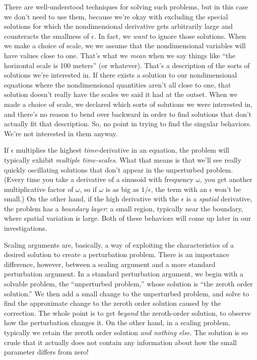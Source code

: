 \documentclass[11pt]{book}
\begin{document}
There are well-understood techniques for solving such problems, but in this case we don't need to use them, because we're okay with excluding the special solutions for which the nondimensional derivative gets arbitrarily large and counteracts the smallness of $\epsilon$.  In fact, we \emph{want} to ignore those solutions.  When we make a choice of scale, we we assume that the nondimensional variables will have values close to one.  That's what we \emph{mean} when we say things like ``the horizontal scale is 100 meters'' (or whatever).  That's a description of the sorts of solutions we're interested in.  If there exists a solution to our nondimensional equations where the nondimensional quantities aren't all close to one, that solution doesn't really have the scales we said it had at the outset.  When we made a choice of scale, we declared which sorts of solutions we were interested in, and there's no reason to bend over backward in order to find solutions that don't actually fit that description.  So, no point in trying to find the singular behaviors.  We're not interested in them anyway.

If $\epsilon$ multiplies the highest \emph{time}-derivative in an equation, the problem will typically exhibit \emph{multiple time-scales}.  What that means is that we'll see really quickly oscillating solutions that don't appear in the unperturbed problem.  (Every time you take a derivative of a sinusoid with frequency $\omega$, you get another multiplicative factor of $\omega$, so if $\omega$ is as big as $1/\epsilon$, the term with an $\epsilon$ won't be small.)  On the other hand, if the high derivative with the $\epsilon$ is a \emph{spatial} derivative, the problem has a \emph{boundary layer}: a small region, typically near the boundary, where spatial variation is large.  Both of these behaviors will come up later in our investigations.

Scaling arguments are, basically, a way of exploiting the characteristics of a desired solution to create a perturbation problem.  There is an importance difference, however, between a scaling argument and a more standard perturbation argument.  In a standard perturbation argument, we begin with a solvable problem, the ``unperturbed problem,'' whose solution is ``the zeroth order solution.''  We then add a small change to the unperturbed problem, and solve to find the approximate change to the zeroth order solution caused by the correction.  The whole point is to get \emph{beyond} the zeroth-order solution, to observe how the perturbation changes it.  On the other hand, in a scaling problem, typically we retain the zeroth order solution \emph{and nothing else}.  The solution is so crude that it actually does not contain any information about how the small parameter differs from zero!
\end{document}
